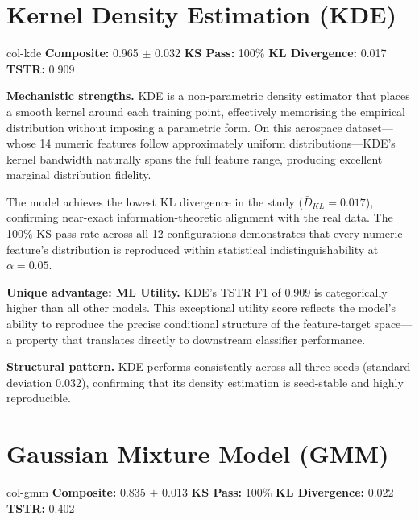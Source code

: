 \documentclass[11pt, a4paper]{report}
\begin{document}
\section{\textcolor{col-kde}{Kernel Density Estimation (KDE)}}

\begin{modelbox}[title={\textbf{KDE} --- 12 configurations, 3 seeds $\times$ 4 sizes}]{col-kde}
\textbf{Composite:} 0.965 $\pm$ 0.032 \quad \textbf{KS Pass:} 100\% \quad \textbf{KL Divergence:} 0.017 \quad \textbf{TSTR:} 0.909
\end{modelbox}

\textbf{Mechanistic strengths.} KDE is a non-parametric density estimator that places a smooth kernel around each training point, effectively memorising the empirical distribution without imposing a parametric form. On this aerospace dataset---whose 14 numeric features follow approximately uniform distributions---KDE's kernel bandwidth naturally spans the full feature range, producing excellent marginal distribution fidelity.

The model achieves the lowest KL divergence in the study ($\bar{D}_{KL} = 0.017$), confirming near-exact information-theoretic alignment with the real data. The 100\% KS pass rate across all 12 configurations demonstrates that every numeric feature's distribution is reproduced within statistical indistinguishability at $\alpha = 0.05$.

\textbf{Unique advantage: ML Utility.} KDE's TSTR F1 of 0.909 is categorically higher than all other models. This exceptional utility score reflects the model's ability to reproduce the precise conditional structure of the feature-target space---a property that translates directly to downstream classifier performance.

\textbf{Structural pattern.} KDE performs consistently across all three seeds (standard deviation 0.032), confirming that its density estimation is seed-stable and highly reproducible.

\section{\textcolor{col-gmm}{Gaussian Mixture Model (GMM)}}

\begin{modelbox}[title={\textbf{GMM} --- 12 configurations, 3 seeds $\times$ 4 sizes}]{col-gmm}
\textbf{Composite:} 0.835 $\pm$ 0.013 \quad \textbf{KS Pass:} 100\% \quad \textbf{KL Divergence:} 0.022 \quad \textbf{TSTR:} 0.402
\end{modelbox}
\end{document}
